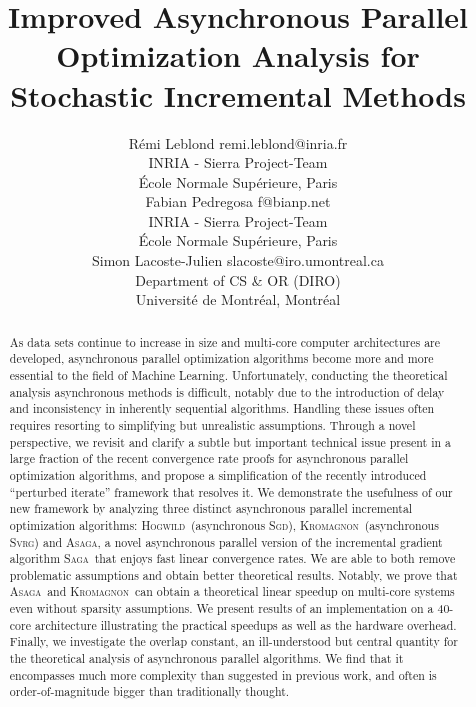 \documentclass[twoside, 11pt]{article}
\newcommand{\ASAGA}{\textsc{Asaga}}
\newcommand{\SAGA}{\textsc{Saga}}
\newcommand{\SVRG}{\textsc{Svrg}}
\newcommand{\Hogwild}{\textsc{Hogwild}}
\newcommand{\SGD}{\textsc{Sgd}}
\newcommand{\KROMAGNON}{\textsc{Kromagnon}}
\begin{document}
\title{Improved Asynchronous Parallel Optimization Analysis for Stochastic Incremental Methods}

\author{\name R\'emi Leblond \email remi.leblond@inria.fr \\
       \addr INRIA - Sierra Project-Team\\
       \'Ecole Normale Sup\'erieure, Paris\\
       \AND
       \name Fabian Pedregosa \email f@bianp.net \\
       \addr INRIA - Sierra Project-Team\\
       \'Ecole Normale Sup\'erieure, Paris\\
       \AND
       \name Simon Lacoste-Julien \email slacoste@iro.umontreal.ca \\
       \addr Department of CS \& OR (DIRO) \\
       Universit\'e de Montr\'eal, Montr\'eal\\ }


\maketitle


\begin{abstract}%
As data sets continue to increase in size and multi-core computer architectures are developed, asynchronous parallel optimization algorithms become more and more essential to the field of Machine Learning.
Unfortunately, conducting the theoretical analysis asynchronous methods is difficult, notably due to the introduction of delay and inconsistency in inherently sequential algorithms.
Handling these issues often requires resorting to simplifying but unrealistic assumptions.
Through a novel perspective, we revisit and clarify a subtle but important technical issue present in a large fraction of the recent convergence rate proofs for asynchronous parallel optimization algorithms, and propose a simplification of the recently introduced ``perturbed iterate'' framework that resolves it.
We demonstrate the usefulness of our new framework by analyzing three distinct asynchronous parallel incremental optimization algorithms: \Hogwild\ (asynchronous \SGD), \KROMAGNON\ (asynchronous \SVRG) and \ASAGA, a novel asynchronous parallel version of the incremental gradient algorithm \SAGA\ that enjoys fast linear convergence rates.
We are able to both remove problematic assumptions and obtain better theoretical results.
Notably, we prove that \ASAGA\ and \KROMAGNON\ can obtain a theoretical linear speedup on multi-core systems even without sparsity assumptions.
We present results of an implementation on a 40-core architecture illustrating the practical speedups as well as the hardware overhead.
Finally, we investigate the overlap constant, an ill-understood but central quantity for the theoretical analysis of asynchronous parallel algorithms.
We find that it encompasses much more complexity than suggested in previous work, and often is order-of-magnitude bigger than traditionally thought.
\end{abstract}
\end{document}

